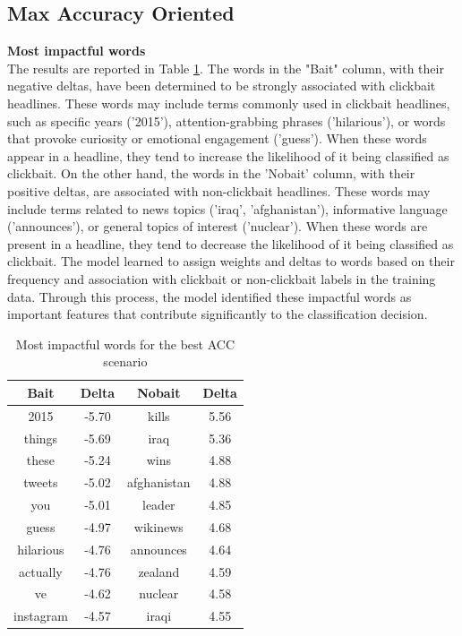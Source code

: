 \documentclass{article}
\begin{document}
\begin{multicols}{2}
\subsection{Max Accuracy Oriented}

\textbf{Most impactful words}\\
The results are reported in Table \ref{tab:MIW_acc_scenario}. 
The words in the "Bait" column, with their negative deltas, have been determined to be strongly associated with clickbait headlines. 
These words may include terms commonly used in clickbait headlines, such as specific years ('2015'), attention-grabbing phrases 
('hilarious'), or words that provoke curiosity or emotional engagement ('guess'). When these words appear in a headline, they 
tend to increase the likelihood of it being classified as clickbait.
On the other hand, the words in the 'Nobait' column, with their positive deltas, are associated with non-clickbait headlines. 
These words may include terms related to news topics ('iraq', 'afghanistan'), informative language ('announces'), or general topics 
of interest ('nuclear'). When these words are present in a headline, they tend to decrease the likelihood of it being classified 
as clickbait.
The model learned 
to assign weights and deltas to words based on their frequency and association with clickbait or non-clickbait labels in the 
training data. Through this process, the model identified these impactful words as important features that contribute significantly 
to the classification decision.

    \begin{table}[H]
        \small
        \centering
        
        \begin{tabular}{|c|c|c|c|}
        \hline
        \rowcolor{pyblue!60}
        \textbf{Bait} & \textbf{Delta} & \textbf{Nobait} & \textbf{Delta}\\ \hline
        2015 & -5.70 & kills & 5.56 \\ \hline
        things & -5.69 & iraq & 5.36 \\ \hline
        these & -5.24 & wins & 4.88 \\ \hline
        tweets & -5.02 & afghanistan & 4.88 \\ \hline
        you & -5.01 & leader & 4.85 \\ \hline
        guess & -4.97 & wikinews & 4.68 \\ \hline
        hilarious & -4.76 & announces & 4.64 \\ \hline
        actually & -4.76 & zealand & 4.59 \\ \hline
        ve & -4.62 & nuclear & 4.58 \\ \hline
        instagram & -4.57 & iraqi & 4.55 \\ \hline
        \end{tabular}
        \caption{\footnotesize Most impactful words for the best ACC scenario}
        \label{tab:MIW_acc_scenario}
    \end{table}



\end{multicols}
\end{document}
